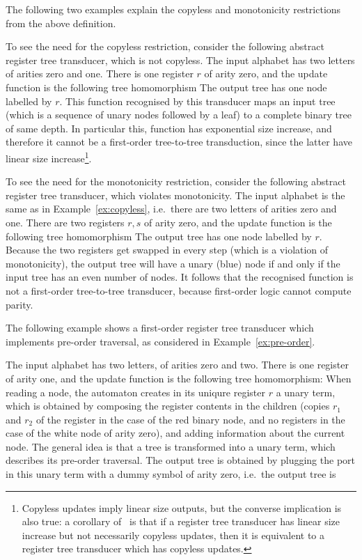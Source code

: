 The following two examples explain the copyless and monotonicity restrictions from the above definition. 
\begin{example}\label{ex:copyless}
    To see the need for the copyless restriction, consider the following abstract register tree transducer, which is not copyless. The input alphabet has two letters of arities zero and one. There is one register $r$ of arity zero, and the update function is the following tree homomorphism 
The output tree has one node labelled by  $r$. This function recognised by this transducer maps an input tree (which is a sequence of unary nodes followed by a leaf)  to a complete binary tree of same depth. In particular this, function has exponential size increase, and therefore it cannot be a first-order tree-to-tree transduction, since the latter have linear size increase\footnote{Copyless updates imply linear size outputs, but the converse implication is also true: a corollary of~\cite[Theorem 7.1]{engelfriet_macro_2003} is that  if a  register tree transducer has linear size increase but not necessarily copyless updates, then it is equivalent to a register tree transducer   which has copyless updates.}.
\end{example}

\begin{example}\label{ex:monotone}
    To see the need for the monotonicity restriction, consider the following abstract register tree transducer, which violates monotonicity. The input alphabet is the same as in Example~\ref{ex:copyless}, i.e.~there are two letters of arities zero and one. There are two registers $r,s$ of arity zero, and the update function is the following tree homomorphism 
    The output tree has one node labelled by  $r$. 
Because the two registers get swapped in every step (which is a violation of monotonicity), the output  tree will have a unary (blue)  node if and only if the input tree has an even number of nodes. It follows that the recognised function is not a first-order tree-to-tree transducer, because first-order logic cannot compute parity. 
\end{example}

The following example shows a first-order register tree transducer which implements pre-order traversal, as considered in Example~\ref{ex:pre-order}.
\begin{example}\label{ex:preorder-register}
    The input alphabet has two letters, of arities zero and two. There is one register of arity one, and the update function is the following tree homomorphism:
    When reading a node, the automaton creates in its uniqure register $r$ a unary term, which is obtained by composing the register contents in the  children (copies $r_1$ and $r_2$ of the register in the case of the red binary node, and no registers in the case of the white node of arity zero), and adding information about the current node. 
    The general idea is that a tree is transformed into a unary term, which describes its pre-order traversal. The output tree is obtained by plugging the port in this unary term with a dummy symbol of arity zero, i.e.~the output tree is 
\end{example}

